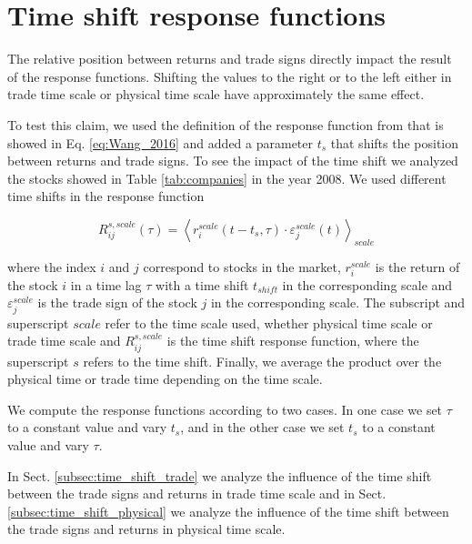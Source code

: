 \section{Time shift response functions}\label{sec:time_shift}

The relative position between returns and trade signs directly impact the
result of the response functions. Shifting the values to the right or to the
left either in trade time scale or physical time scale have approximately the
same effect.

To test this claim, we used the definition of the response function from
\cite{Wang_2016_cross} that is showed in Eq. \ref{eq:Wang_2016} and added
a parameter $t_{s}$ that shifts the position between returns and trade signs.
To see the impact of the time shift we analyzed the stocks showed in Table
\ref{tab:companies} in the year 2008. We used different time shifts in the
response function

\begin{equation}\label{eq:time_shift_general}
    R_{ij}^{s, scale}\left(\tau\right)=\left\langle r^{scale}_{i}
    \left(t-t_{s},\tau\right) \cdot\varepsilon^{scale}_{j}
    \left(t\right)\right\rangle _{scale}
\end{equation}

where the index $i$ and $j$ correspond to stocks in the market, $r^{scale}_{i}$
is the return of the stock $i$ in a time lag $\tau$ with a time shift
$t_{shift}$ in the corresponding scale and $\varepsilon^{scale}_{j}$ is the
trade sign of the stock $j$ in the corresponding scale. The subscript and
superscript $scale$ refer to the time scale used, whether physical time scale
or trade time scale and $R_{ij}^{s,scale}$ is the time shift response function,
where the superscript $s$ refers to the time shift. Finally, we average the
product over the physical time or trade time depending on the time scale.

We compute the response functions according to two cases. In one case we set
$\tau$ to a constant value and vary $t_{s}$, and in the other case we set
$t_{s}$ to a constant value and vary $\tau$.

In Sect. \ref{subsec:time_shift_trade} we analyze the influence of the time
shift between the trade signs and returns in trade time scale and in Sect.
\ref{subsec:time_shift_physical} we analyze the influence of the time shift
between the trade signs and returns in physical time scale.

